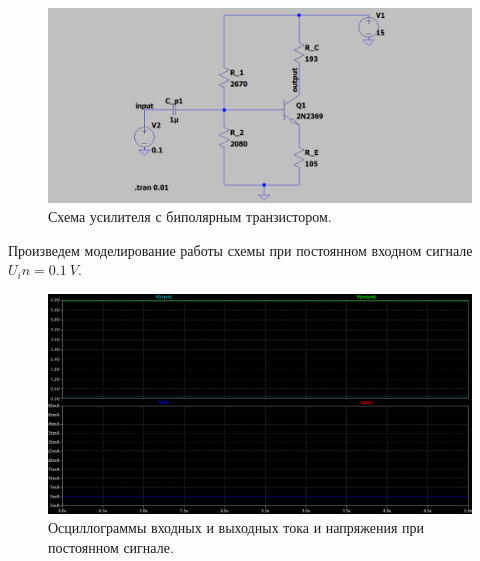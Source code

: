 \documentclass[12pt]{article}
\begin{document}
\begin{figure}[H]
    \centering
    \includegraphics[width=\textwidth]{3_scheme.png}
    \caption{Схема усилителя с биполярным транзистором.}
    \label{fig:3_scheme.png}
\end{figure}

Произведем моделирование работы схемы при постоянном входном сигнале $U_in = 0.1 \ V.$
\begin{figure}[H]
    \centering
    \includegraphics[width=\textwidth]{3_const_i_v.png}
    \caption{Осциллограммы входных и выходных тока и напряжения при постоянном сигнале.}
    \label{fig:3_const_i_v.png}
\end{figure}
\end{document}
